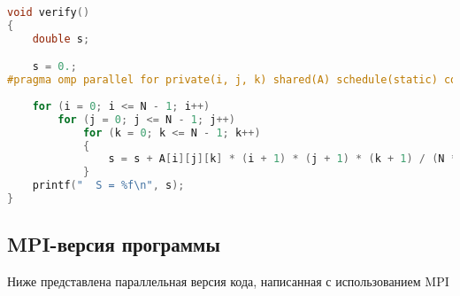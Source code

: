 \begin{lstlisting}[language=c++]
void verify()
{
    double s;

    s = 0.;
#pragma omp parallel for private(i, j, k) shared(A) schedule(static) collapse(3) reduction(+ \
                                                                                           : s)
    for (i = 0; i <= N - 1; i++)
        for (j = 0; j <= N - 1; j++)
            for (k = 0; k <= N - 1; k++)
            {
                s = s + A[i][j][k] * (i + 1) * (j + 1) * (k + 1) / (N * N * N);
            }
    printf("  S = %f\n", s);
}

\end{lstlisting}

\subsection{MPI-версия программы}
Ниже представлена параллельная версия кода, написанная с использованием MPI
